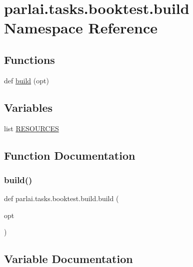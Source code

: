 \hypertarget{namespaceparlai_1_1tasks_1_1booktest_1_1build}{}\section{parlai.\+tasks.\+booktest.\+build Namespace Reference}
\label{namespaceparlai_1_1tasks_1_1booktest_1_1build}
\subsection*{Functions}
\begin{DoxyCompactItemize}
\item 
def \hyperlink{namespaceparlai_1_1tasks_1_1booktest_1_1build_acc4c0b0b235424ab52a434d122d857cc}{build} (opt)
\end{DoxyCompactItemize}
\subsection*{Variables}
\begin{DoxyCompactItemize}
\item 
list \hyperlink{namespaceparlai_1_1tasks_1_1booktest_1_1build_a6b172b24eaec6c8e34cfeab0f22587ff}{R\+E\+S\+O\+U\+R\+C\+ES}
\end{DoxyCompactItemize}


\subsection{Function Documentation}
\mbox{\label{namespaceparlai_1_1tasks_1_1booktest_1_1build_acc4c0b0b235424ab52a434d122d857cc}} 
\subsubsection{\texorpdfstring{build()}{build()}}
{\footnotesize\ttfamily def parlai.\+tasks.\+booktest.\+build.\+build (\begin{DoxyParamCaption}\item[{}]{opt }\end{DoxyParamCaption})}



\subsection{Variable Documentation}
\mbox{\label{namespaceparlai_1_1tasks_1_1booktest_1_1build_a6b172b24eaec6c8e34cfeab0f22587ff}} 
